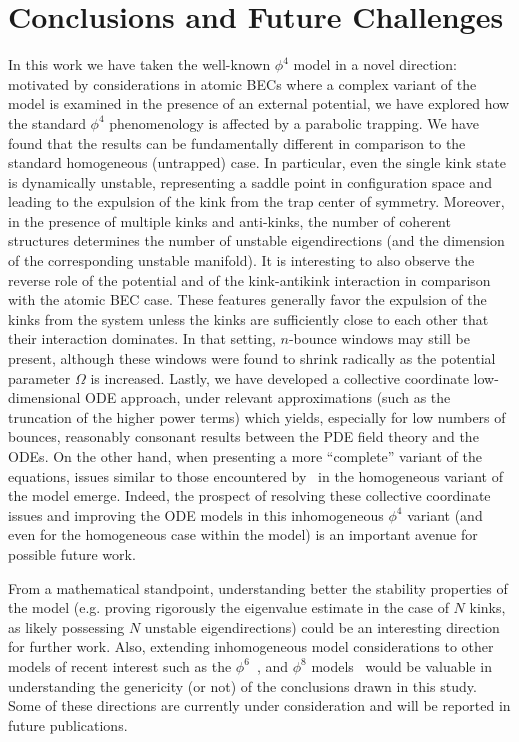 \documentclass[vecphys]{svmult}		%
\begin{document}
{\section{Conclusions and Future Challenges}
In this work we have taken the well-known $\phi^4$ model in a
novel direction: motivated by considerations in atomic BECs
where a complex variant of the model is examined in the presence
of an external potential, we have explored how the standard
$\phi^4$ phenomenology is affected by a parabolic trapping.
We have found that the results can be fundamentally different
in comparison to the standard homogeneous (untrapped) case.
In particular, even the single kink state is dynamically
unstable, representing a saddle point in configuration
space and leading to the expulsion of the kink from the
trap center of symmetry. Moreover, in the presence of
multiple kinks and anti-kinks, the number of coherent structures
determines the number of unstable eigendirections (and the
dimension of the corresponding unstable manifold).
It is interesting to also observe the reverse role of
the potential and of the kink-antikink interaction in comparison
with the atomic BEC case. These features generally favor
the expulsion of the kinks from the system unless the kinks
are sufficiently close to each other that their interaction
dominates. In that setting, $n$-bounce windows may still be present,
although these windows were found to shrink radically
as the potential parameter $\Omega$ is increased.
Lastly, we have developed a collective coordinate low-dimensional
ODE approach, under relevant approximations (such as the truncation
of the higher power terms) which yields, especially for low
numbers of bounces, reasonably consonant results between the
PDE field theory and the ODEs. On the other hand, when presenting
a more ``complete'' variant of the equations, issues similar
to those encountered by~\cite{weigel,weigel2} in the homogeneous
variant of the model emerge. 
Indeed, the prospect of resolving these collective coordinate issues and improving the
ODE models in this inhomogeneous $\phi^4$ variant (and even
for the homogeneous case within the model) is an important
avenue for possible future work.

From a mathematical standpoint, understanding better the
stability properties of the model (e.g. proving rigorously
the eigenvalue estimate in the case of $N$ kinks, as likely
possessing $N$ unstable eigendirections) could be
an interesting direction for further work. Also, extending
inhomogeneous model considerations to other models of
recent interest such as the $\phi^6$~\cite{shnir1,weigel,gani1,danial,usrecent},
and $\phi^8$ models~\cite{gani4,gani5,ivanrecent} would
be valuable in understanding the genericity
(or not) of the conclusions drawn in this study. Some of these
directions are currently under consideration and will
be reported in future publications.



}
\end{document}
